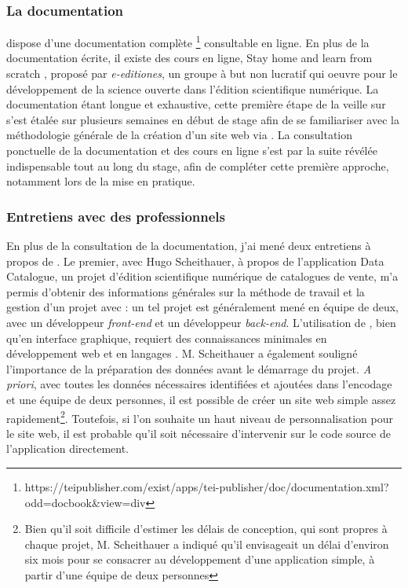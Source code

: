 \subsubsection{La documentation}
\tp dispose d'une documentation complète \footnote{https://teipublisher.com/exist/apps/tei-publisher/doc/documentation.xml?odd=docbook\&view=div} consultable en ligne. En plus de la documentation écrite, il existe des cours en ligne, \og Stay home and learn \TEI from scratch \fg, proposé par \textit{e-editiones}, un groupe à but non lucratif qui oeuvre pour le développement de la science ouverte dans l'édition scientifique numérique. La documentation étant longue et exhaustive, cette première étape de la veille sur \tp s'est étalée sur plusieurs semaines en début de stage afin de se familiariser avec la méthodologie générale de la création d'un site web via \tp. La consultation ponctuelle de la documentation et des cours en ligne s'est par la suite révélée indispensable tout au long du stage, afin de compléter cette première approche, notamment lors de la mise en pratique. 

\subsubsection{Entretiens avec des professionnels}
En plus de la consultation de la documentation, j'ai mené deux entretiens à propos de \tp. Le premier, avec Hugo Scheithauer, à propos de l'application Data Catalogue, un projet d'édition scientifique numérique de catalogues de vente, m'a permis d'obtenir des informations générales sur la méthode de travail et la gestion d'un projet avec \tp : un tel projet est généralement mené en équipe de deux, avec un développeur \textit{front-end} et un développeur \textit{back-end}. L'utilisation de \tp, bien qu'en interface graphique, requiert des connaissances minimales en développement web et en langages \XML. M. Scheithauer a également souligné l'importance de la préparation des données avant le démarrage du projet. \textit{A priori}, avec toutes les données nécessaires identifiées et ajoutées dans l'encodage et une équipe de deux personnes, il est possible de créer un site web simple assez rapidement\footnote{Bien qu'il soit difficile d'estimer les délais de conception, qui sont propres à chaque projet, M. Scheithauer a indiqué qu'il envisageait un délai d'environ six mois pour se consacrer au développement d'une application simple, à partir d'une équipe de deux personnes}. Toutefois, si l'on souhaite un haut niveau de personnalisation pour le site web, il est probable qu'il soit nécessaire d'intervenir sur le code source de l'application directement.

